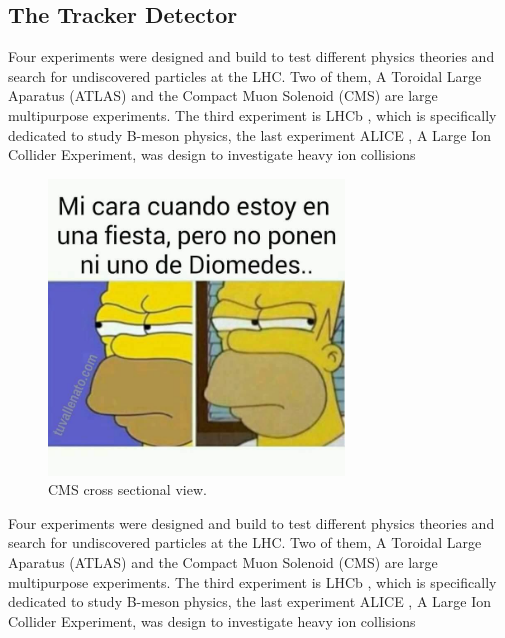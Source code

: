 \subsection{The Tracker Detector}
Four experiments were designed and build to test different physics theories and search for undiscovered particles at the LHC. Two of them, A Toroidal Large Aparatus (ATLAS)\cite{atlas} and the Compact Muon Solenoid (CMS)\cite{cms_doc} are large multipurpose experiments. The third experiment is LHCb \cite{lhcb}, which is specifically dedicated to study B-meson physics, the last experiment ALICE \cite{alice}, A Large Ion Collider Experiment, was design to investigate heavy ion collisions
\begin{figure}[!h]
  \centering
  \includegraphics[width=0.7\textwidth]{../images/ch2/4}
  \caption[CMS cross sectional view]{CMS cross sectional view.}\label{fig:cms_layout}
\end{figure}
Four experiments were designed and build to test different physics theories and search for undiscovered particles at the LHC. Two of them, A Toroidal Large Aparatus (ATLAS)\cite{atlas} and the Compact Muon Solenoid (CMS)\cite{cms_doc} are large multipurpose experiments. The third experiment is LHCb \cite{lhcb}, which is specifically dedicated to study B-meson physics, the last experiment ALICE \cite{alice}, A Large Ion Collider Experiment, was design to investigate heavy ion collisions
